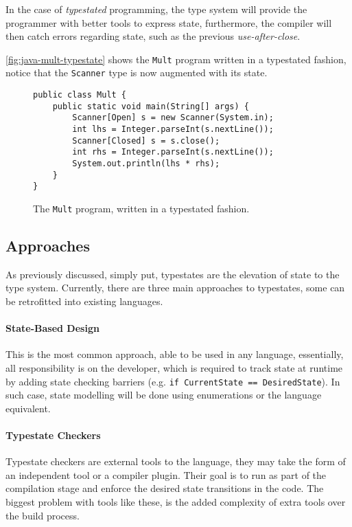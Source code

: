 In the case of \emph{typestated} programming,
the type system will provide the programmer with better tools to express state,
furthermore, the compiler will then catch errors regarding state,
such as the previous \emph{use-after-close}.

\autoref{fig:java-mult-typestate} shows the \texttt{Mult} program written in a typestated fashion,
notice that the \texttt{Scanner} type is now augmented with its state.

\begin{figure}
    \centering
    \begin{verbatim}
public class Mult {
    public static void main(String[] args) {
        Scanner[Open] s = new Scanner(System.in);
        int lhs = Integer.parseInt(s.nextLine());
        Scanner[Closed] s = s.close();
        int rhs = Integer.parseInt(s.nextLine());
        System.out.println(lhs * rhs);
    }
}
    \end{verbatim}
    \label{fig:java-mult-typestate}
    \caption{The \texttt{Mult} program, written in a typestated fashion.}
\end{figure}

\subsection{Approaches}

As previously discussed, simply put, typestates are the elevation of state to the type system.
Currently, there are three main approaches to typestates,
some can be retrofitted into existing languages.

\paragraph{State-Based Design}
This is the most common approach, able to be used in any language,
essentially, all responsibility is on the developer, which is required to track state at runtime by adding
state checking barriers (e.g. \texttt{if CurrentState == DesiredState}).
In such case, state modelling will be done using enumerations or the language equivalent.

\paragraph{Typestate Checkers}
Typestate checkers are external tools to the language,
they may take the form of an independent tool or a compiler plugin.
Their goal is to run as part of the compilation stage and enforce the desired state transitions in the code.
The biggest problem with tools like these,
is the added complexity of extra tools over the build process.

